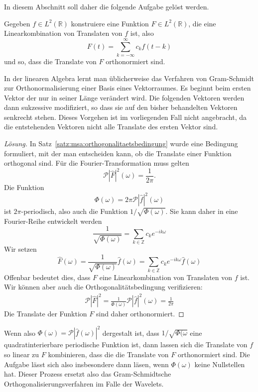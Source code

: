 

In diesem Abschnitt soll daher die folgende Aufgabe gelöst werden.
\begin{aufgabe}
\label{aufgabe:orthonormalisierung}
Gegeben $f\in L^2(\mathbb R)$ konstruiere eine Funktion 
$F\in L^2(\mathbb R)$, die eine Linearkombination von 
Translaten von $f$ ist, also
\[
F(t) = \sum_{k=-\infty}^\infty c_k f(t-k)
\]
und so, dass die Translate von $F$ orthonormiert sind.
\end{aufgabe}

In der linearen Algebra lernt man üblicherweise das Verfahren von
Gram-Schmidt zur Orthonormalisierung einer Basis eines Vektorraumes.
Es beginnt beim ersten Vektor der nur in seiner Länge verändert wird.
Die folgenden Vektoren werden dann sukzessive modifiziert, so dass sie
auf den bisher behandelten Vektoren senkrecht stehen.
Dieses Vorgehen ist im vorliegenden Fall nicht angebracht, da die
entstehenden Vektoren nicht alle Translate des ersten Vektor sind.

\begin{proof}[Lösung]
In Satz~\ref{satz:msa:orthogonalitaetsbedingung} wurde eine Bedingung
formuliert, mit der man entscheiden kann, ob die Translate einer 
Funktion orthogonal sind.
Für die Fourier-Transformation muss gelten
\[
\mathcal{P}|\hat{F}|^2(\omega)
=
\frac{1}{2\pi}.
\]
Die Funktion 
\[
\Phi(\omega)
=
2\pi\mathcal{P}|\hat{f}|^2(\omega)
\]
ist $2\pi$-periodisch, also auch die Funktion $1/\sqrt{\Phi(\omega)}$.
Sie kann daher in eine Fourier-Reihe entwickelt werden
\[
\frac{1}{\sqrt{\Phi(\omega)}}
=
\sum_{k\in\mathbb Z} c_ke^{-ik\omega}
\]
Wir setzen 
\[
\hat{F}(\omega)
=
\frac{1}{\sqrt{\Phi(\omega)}} 
\hat{f}(\omega)
=
\sum_{k\in\mathbb Z} c_ke^{-ik\omega}\hat{f}(\omega)
\]
Offenbar bedeutet dies, dass $F$ eine Linearkombination von Translaten
von $f$ ist.
Wir können aber auch die Orthogonalitätsbedingung verifizieren:
\begin{align*}
\mathcal{P}|\hat{F}|^2
=
\frac{1}{\Phi(\omega)} \mathcal{P}|\hat{f}|^2(\omega)
=
\frac{1}{2\pi}
\end{align*}
Die Translate der Funktion $F$ sind daher orthonormiert.
\end{proof}

Wenn also
$\Phi(\omega)=\mathcal{P}|\hat{f}(\omega)|^2$ dergestalt ist, dass 
$1/\sqrt{\Phi(\omega}$ eine quadratinterierbare periodische Funktion ist,
dann lassen sich die Translate von $f$ so linear zu $F$ kombinieren, dass die
die Translate von $F$ orthonormiert sind.
Die Aufgabe lässt sich also insbesondere dann läsen, wenn $\Phi(\omega)$
keine Nullstellen hat.
Dieser Prozess ersetzt also das Gram-Schmidtsche Orthogonalisierungsverfahren
im Falle der Wavelets.





